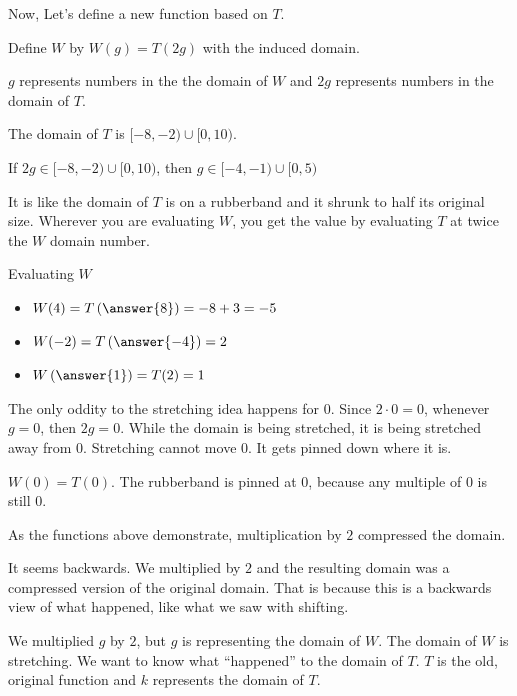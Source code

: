 \documentclass{ximera}
\begin{document}
Now, Let's define a new function based on $T$.



Define $W$ by $W(g) = T(2g)$ with the induced domain.



$g$ represents numbers in the the domain of $W$ and $2g$ represents numbers in the domain of $T$.  

The domain of $T$ is $[-8,-2) \cup [0,10)$.


If $2g \in [-8,-2) \cup [0,10)$, then $g \in [-4,-1) \cup [0,5)$

It is like the domain of $T$ is on a rubberband and it shrunk to half its original size. Wherever you are evaluating $W$, you get the value by evaluating $T$ at twice the $W$ domain number.



\begin{example}  Evaluating $W$

\begin{itemize}
\item $W(4) = T\left(\answer{8}\right) = -8+3=-5$
\item $W(-2) = T\left(\answer{-4}\right) = 2$
\item $W\left(\answer{1}\right) = T(2) = 1$
\end{itemize}


\end{example}


The only oddity to the stretching idea happens for $0$.  Since $2 \cdot 0 = 0$, whenever $g = 0$, then $2g = 0$.  While the domain is being stretched, it is being stretched away from $0$. Stretching cannot move $0$. It gets pinned down where it is.


$W(0) = T(0)$.  The rubberband is pinned at $0$, because any multiple of $0$ is still $0$.  

As the functions above demonstrate, multiplication by $2$ compressed the domain.

It seems backwards.  We multiplied by $2$ and the resulting domain was a compressed version of the original domain.  That is because this is a backwards view of what happened, like what we saw with shifting.



We multiplied $g$ by $2$, but $g$ is representing the domain of $W$.  The domain of $W$ is stretching.  We want to know what ``happened'' to the domain of $T$.  $T$ is the old, original function and $k$ represents the domain of $T$.  
\end{document}
